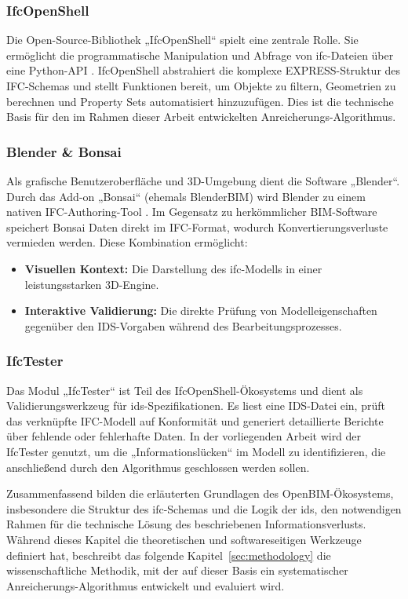 \subsubsection{IfcOpenShell}
Die Open-Source-Bibliothek „IfcOpenShell“ spielt eine zentrale Rolle. Sie ermöglicht die programmatische Manipulation und Abfrage von \gls{ifc}-Dateien über eine Python-API \cite{ifcopenshell}. IfcOpenShell abstrahiert die komplexe EXPRESS-Struktur des IFC-Schemas und stellt Funktionen bereit, um Objekte zu filtern, Geometrien zu berechnen und Property Sets automatisiert hinzuzufügen. Dies ist die technische Basis für den im Rahmen dieser Arbeit entwickelten Anreicherungs-Algorithmus.

\subsubsection{Blender \& Bonsai}
Als grafische Benutzeroberfläche und 3D-Umgebung dient die Software „Blender“. Durch das Add-on „Bonsai“ (ehemals BlenderBIM) wird Blender zu einem nativen IFC-Authoring-Tool \cite{ifcopenshell}. Im Gegensatz zu herkömmlicher BIM-Software speichert Bonsai Daten direkt im IFC-Format, wodurch Konvertierungsverluste vermieden werden.
Diese Kombination ermöglicht:
\begin{itemize}
    \item \textbf{Visuellen Kontext:} Die Darstellung des \gls{ifc}-Modells in einer leistungsstarken 3D-Engine.
    \item \textbf{Interaktive Validierung:} Die direkte Prüfung von Modelleigenschaften gegenüber den IDS-Vorgaben während des Bearbeitungsprozesses.
\end{itemize}

\subsubsection{IfcTester}
Das Modul „IfcTester“ ist Teil des IfcOpenShell-Ökosystems und dient als Validierungswerkzeug für \gls{ids}-Spezifikationen. Es liest eine IDS-Datei ein, prüft das verknüpfte IFC-Modell auf Konformität und generiert detaillierte Berichte über fehlende oder fehlerhafte Daten. In der vorliegenden Arbeit wird der IfcTester genutzt, um die „Informationslücken“ im Modell zu identifizieren, die anschließend durch den Algorithmus geschlossen werden sollen.

Zusammenfassend bilden die erläuterten Grundlagen des OpenBIM-Ökosystems, insbesondere die Struktur des \gls{ifc}-Schemas und die Logik der \gls{ids}, den notwendigen Rahmen für die technische Lösung des beschriebenen Informationsverlusts. Während dieses Kapitel die theoretischen und softwareseitigen Werkzeuge definiert hat, beschreibt das folgende Kapitel~\ref{sec:methodology} die wissenschaftliche Methodik, mit der auf dieser Basis ein systematischer Anreicherungs-Algorithmus entwickelt und evaluiert wird.
